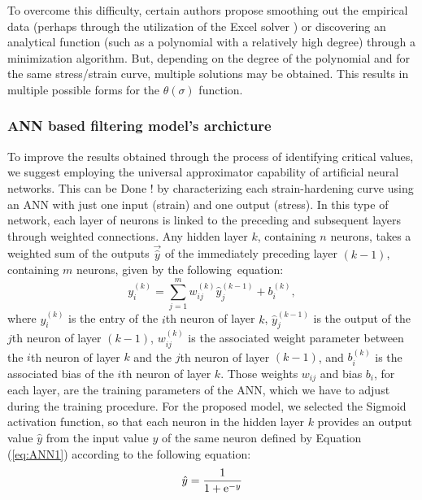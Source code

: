 \documentclass[metals,article,submit,pdftex,moreauthors]{Definitions/mdpi}
\DeclareRobustCommand{\e}[1]{{\rm e}^{#1}}
\DeclareRobustCommand{\lay}[1]{^{(#1)}}
\begin{document}
To overcome this difficulty, certain authors propose smoothing out the empirical data (perhaps through the utilization of the Excel solver \cite{Najafizadeh-2006}) or discovering an analytical function (such as a polynomial with a relatively high degree) through a minimization algorithm.
But, depending on the degree of the polynomial and for the same stress/strain curve, multiple solutions may be obtained.
This results in multiple possible forms for the $\theta(\sigma)$ function.

\subsubsection{ANN based filtering model's archicture \label{subsec:ANNbasics}}

To improve the results obtained through the process of identifying critical values, we suggest employing the universal approximator capability of artificial neural networks.
This can be Done ! by characterizing each strain-hardening curve using an ANN with just one input (strain) and one output (stress).
In this type of network, each layer of neurons is linked to the preceding and subsequent layers through weighted connections.
Any hidden layer $k$, containing $n$ neurons, takes a weighted sum of the outputs $\overrightarrow{\hat{y}}$ of the immediately preceding layer $(k-1)$, containing $m$ neurons, given by the following~equation:
\begin{equation}
y_i\lay{k} = \sum_{j=1}^m w_{ij}\lay{k} \hat{y}_j^{(k-1)}+ b_i\lay{k},\label{eq:ANN1}
\end{equation}
where $y_i\lay{k}$ is the entry of the $i$th neuron of layer $k$, $\hat{y}_j\lay{k-1}$ is the output of the $j$th neuron of layer $(k-1)$, $w_{ij}\lay{k}$ is the associated weight parameter between the $i$th neuron of layer $k$ and the $j$th neuron of layer $(k-1)$, and $b_i\lay{k}$ is the associated bias of the $i$th neuron of layer $k$.
Those weights $w_{ij}$ and bias $b_i$, for each layer, are the training parameters of the ANN, which we have to adjust during the training procedure.
For the proposed model, we selected the Sigmoid activation function, so that each neuron in the hidden layer $k$ provides an output value ${\hat{y}}$ from the input value $y$ of the same neuron defined by Equation (\ref{eq:ANN1}) according to the following equation:
\begin{equation}
\hat{y}=\frac{1}{1 + \e{-y}}\label{eq:ANN2}
\end{equation}
\end{document}
